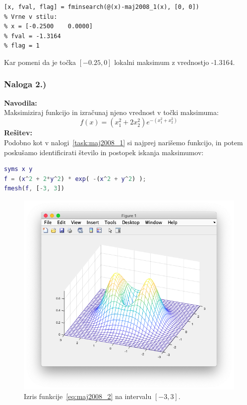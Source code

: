 \documentclass[a4paper,11pt]{article}
\begin{document}
\begin{lstlisting}
[x, fval, flag] = fminsearch(@(x)-maj2008_1(x), [0, 0])
% Vrne v stilu:
% x = [-0.2500    0.0000]
% fval = -1.3164
% flag = 1
\end{lstlisting}
Kar pomeni da je točka $[-0.25, 0]$ lokalni maksimum z vrednostjo -1.3164.


\subsubsection{Naloga 2.)}
\label{task:maj2008_2}

\textbf{Navodila:} \\
Maksimiziraj funkcijo in izračunaj njeno vrednost v točki maksimuma:
\begin{equation} \label{eq:maj2008_2}
f(x) = (x_1^2 + 2x_2^2)e^{-(x_1^2 + x_2^2)}
\end{equation}
\textbf{Rešitev:} \\
Podobno kot v nalogi~\ref{task:maj2008_1} si najprej narišemo funkcijo, in potem poskušamo identificirati število in postopek iskanja maksimumov:

\begin{lstlisting}[language=Matlab]
syms x y
f = (x^2 + 2*y^2) * exp( -(x^2 + y^2) );
fmesh(f, [-3, 3])
\end{lstlisting}

\begin{figure}[hbt]
\centering
\includegraphics[scale=.4]{images/nal2_maj2008_plot.png}
\caption{Izris funkcije~\ref{eq:maj2008_2} na intervalu $[-3, 3]$.}
\label{img:maj2008_2_plot}
\end{figure}
\end{document}
